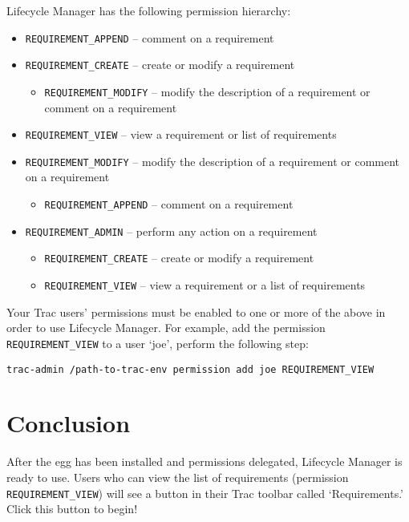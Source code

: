 \documentclass{article}
\begin{document}
Lifecycle Manager has the following permission hierarchy:
\begin{itemize}
  \item \texttt{REQUIREMENT\_APPEND} -- comment on a requirement
  \item \texttt{REQUIREMENT\_CREATE} -- create or modify a requirement
  	\begin{itemize}
      \item \texttt{REQUIREMENT\_MODIFY} -- modify the description of a
      requirement or comment on a requirement
    \end{itemize}
  \item \texttt{REQUIREMENT\_VIEW} -- view a requirement or list of requirements
  \item \texttt{REQUIREMENT\_MODIFY} -- modify the description of a requirement
  or comment on a requirement
  	\begin{itemize}
      \item \texttt{REQUIREMENT\_APPEND} -- comment on a requirement
    \end{itemize}
  \item \texttt{REQUIREMENT\_ADMIN} -- perform any action on a requirement
  	\begin{itemize}
      \item \texttt{REQUIREMENT\_CREATE} -- create or modify a requirement
      \item \texttt{REQUIREMENT\_VIEW} -- view a requirement or a list of requirements
    \end{itemize}
\end{itemize}

Your Trac users' permissions must be enabled to one or more of the above in
order to use Lifecycle Manager. For example, add the permission
\texttt{REQUIREMENT\_VIEW} to a user `joe', perform the following step:
\begin{verbatim}
trac-admin /path-to-trac-env permission add joe REQUIREMENT_VIEW
\end{verbatim}

\section{Conclusion}

After the egg has been installed and permissions delegated, Lifecycle Manager is
ready to use. Users who can view the list of requirements (permission
\texttt{REQUIREMENT\_VIEW}) will see a button in their Trac toolbar called
`Requirements.' Click this button to begin!
\end{document}
